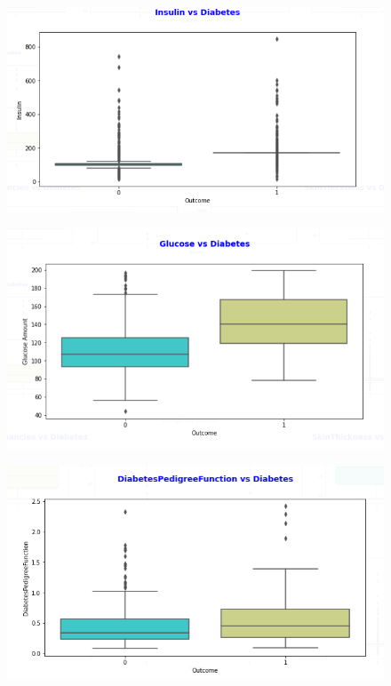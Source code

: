 \documentclass[11pt]{article}
\begin{document}
\begin{itemize}
	\begin{figure}[h]
		\centerline{\small 
			\includegraphics[height=0.2\textheight]  {bw4}}
	\end{figure}
\newpage
	\begin{figure}[h]
		\centerline{\small 
			\includegraphics[height=0.2\textheight]  {bw5}}
	\end{figure}

	\begin{figure}[h]
		\centerline{\small 
			\includegraphics[height=0.2\textheight]  {bw7}}
	\end{figure}
	

	
	
	\newpage 
	

	
	
	
\end{itemize}
\end{document}
